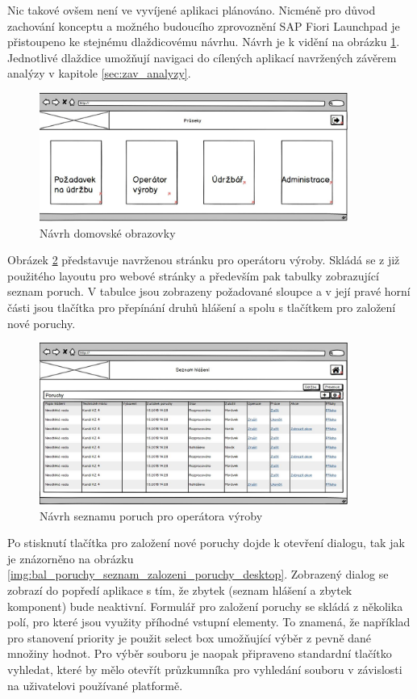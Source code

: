 \documentclass[thesis=M,czech]{FITthesis}[2012/06/26]
\begin{document}
Nic takové ovšem není ve vyvíjené aplikaci plánováno. Nicméně pro důvod zachování konceptu a možného budoucího zprovoznění SAP Fiori Launchpad je přistoupeno ke stejnému dlaždicovému návrhu. Návrh je k vidění na obrázku \ref{img:bal_homepage_desktop}. Jednotlivé dlaždice umožňují navigaci do cílených aplikací navržených závěrem analýzy v kapitole \ref{sec:zav_analyzy}.
\begin{figure}[H]
	\centering
	\includegraphics[width=0.9\textwidth]{images/bal_homepage}
	\caption{Návrh domovské obrazovky}
	\label{img:bal_homepage_desktop}
\end{figure}
Obrázek \ref{img:bal_poruchy_seznam_desktop} představuje navrženou stránku pro operátoru výroby. Skládá se z již použitého layoutu pro webové stránky a především pak tabulky zobrazující seznam poruch. V tabulce jsou zobrazeny požadované sloupce a v její pravé horní části jsou tlačítka pro přepínání druhů hlášení a spolu s tlačítkem pro založení nové poruchy. 
\begin{figure}[H]
	\centering
	\includegraphics[width=0.9\textwidth]{images/bal_poruchy_seznam}
	\caption{Návrh seznamu poruch pro operátora výroby}
	\label{img:bal_poruchy_seznam_desktop}
\end{figure}
Po stisknutí tlačítka pro založení nové poruchy dojde k otevření dialogu, tak jak je znázorněno na obrázku \ref{img:bal_poruchy_seznam_zalozeni_poruchy_desktop}. Zobrazený dialog se zobrazí do popředí aplikace s tím, že zbytek (seznam hlášení a zbytek komponent) bude neaktivní. Formulář pro založení poruchy se skládá z několika polí, pro které jsou využity příhodné vstupní elementy. To znamená, že například pro stanovení priority je použit select box umožňující výběr z pevně dané množiny hodnot. Pro výběr souboru je naopak připraveno standardní tlačítko vyhledat, které by mělo otevřít průzkumníka pro vyhledání souboru v závislosti na uživatelovi používané platformě. 
\end{document}
